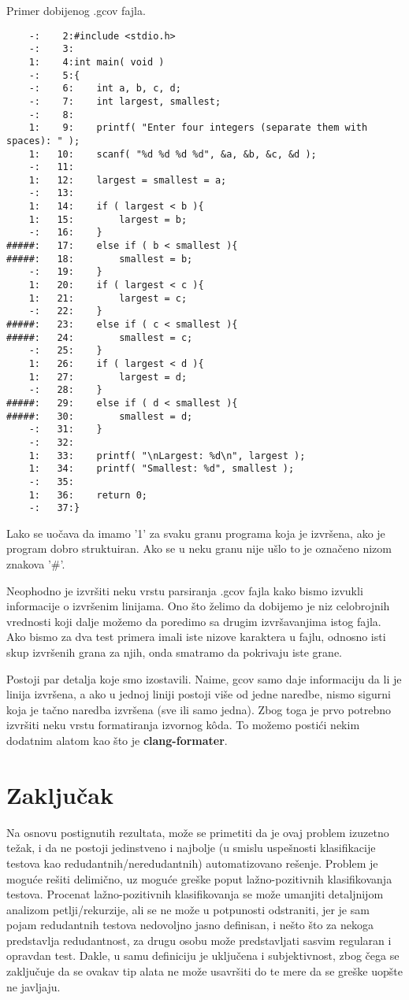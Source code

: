 \documentclass[a4paper]{article}
\begin{document}
Primer dobijenog .gcov fajla.
\begin{lstlisting}
	-:    2:#include <stdio.h>
	-:    3:
	1:    4:int main( void )
	-:    5:{   
	-:    6:    int a, b, c, d;
	-:    7:    int largest, smallest;
	-:    8:
	1:    9:    printf( "Enter four integers (separate them with spaces): " );
	1:   10:    scanf( "%d %d %d %d", &a, &b, &c, &d );
	-:   11:
	1:   12:    largest = smallest = a;
	-:   13:
	1:   14:    if ( largest < b ){
	1:   15:        largest = b;
	-:   16:    }
#####:   17:    else if ( b < smallest ){
#####:   18:        smallest = b;
	-:   19:    }
	1:   20:    if ( largest < c ){
	1:   21:        largest = c;
	-:   22:    }
#####:   23:    else if ( c < smallest ){
#####:   24:        smallest = c;
	-:   25:    }
	1:   26:    if ( largest < d ){
	1:   27:        largest = d;
	-:   28:    }
#####:   29:    else if ( d < smallest ){
#####:   30:        smallest = d;
	-:   31:    }
	-:   32:
	1:   33:    printf( "\nLargest: %d\n", largest );
	1:   34:    printf( "Smallest: %d", smallest );
	-:   35:
	1:   36:    return 0;
	-:   37:}
\end{lstlisting}

Lako se uočava da imamo '1' za svaku granu programa koja je izvršena, ako je program dobro struktuiran. Ako se u neku granu nije ušlo to je označeno nizom znakova '\#'.

Neophodno je izvršiti neku vrstu parsiranja .gcov fajla kako bismo izvukli informacije o izvršenim linijama. Ono što želimo da dobijemo je niz celobrojnih vrednosti koji dalje možemo da poredimo sa drugim izvršavanjima istog fajla. Ako bismo za dva test primera imali iste nizove karaktera u fajlu, odnosno isti skup izvršenih grana za njih, onda smatramo da pokrivaju iste grane. 

Postoji par detalja koje smo izostavili. Naime, gcov samo daje informaciju da li je linija izvršena, a ako u jednoj liniji postoji više od jedne naredbe, nismo sigurni koja je tačno naredba izvršena (sve ili samo jedna). Zbog toga je prvo potrebno izvršiti neku vrstu formatiranja izvornog kôda. To možemo postići nekim dodatnim alatom kao što je \textbf{clang-formater}.

\section{Zaključak}
\label{sec:zakljucak}
Na osnovu postignutih rezultata, može se primetiti da je ovaj problem izuzetno težak, i da ne postoji jedinstveno i najbolje (u smislu uspešnosti klasifikacije testova kao redudantnih/neredudantnih) automatizovano rešenje. Problem je moguće rešiti delimično, uz moguće greške poput lažno-pozitivnih klasifikovanja testova. Procenat lažno-pozitivnih klasifikovanja se može umanjiti detaljnijom analizom petlji/rekurzije, ali se ne može u potpunosti odstraniti, jer je sam pojam redudantnih testova nedovoljno jasno definisan, i nešto što za nekoga predstavlja redudantnost, za drugu osobu može predstavljati sasvim regularan i opravdan test. Dakle, u samu definiciju je uključena i subjektivnost, zbog čega se zaključuje da se ovakav tip alata ne može usavršiti do te mere da se greške uopšte ne javljaju.
\end{document}
